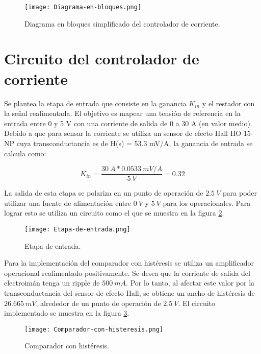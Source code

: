 \begin{figure}[H]
	\centering
	\texttt{[image: Diagrama-en-bloques.png]}
	\caption{Diagrama en bloques simplificado del controlador de corriente.}
	\label{fig:img_diag-en-bloques}
\end{figure}

\section{Circuito del controlador de corriente}

\noindent Se plantea la etapa de entrada que consiste en la ganancia $K_{in}$ y el restador con la señal realimentada. El objetivo es mapear una tensión de referencia en la entrada entre 0 y 5 V con una corriente de salida de 0 a 30 A (en valor medio).  Debido a que para sensar la corriente se utiliza un sensor de efecto Hall HO 15-NP cuya transconductancia es de H(s) = 53.3 mV/A, la ganancia de entrada se calcula como:

\begin{equation}
	K_{in}=\frac{30\:A*0.0533\:mV/A}{5\:V}=0.32 
\end{equation}


La salida de esta etapa se polariza en un punto de operación de $2.5\:V$ para poder utilizar una fuente de alimentación entre $0\:V$ y $5\:V$ para los operacionales. Para lograr esto se utiliza un circuito como el que se muestra en la figura \ref{fig:img_etapa-de-entrada}.


\begin{figure}[H]
	\centering
	\texttt{[image: Etapa-de-entrada.png]}
	\caption{Etapa de entrada.}
	\label{fig:img_etapa-de-entrada}
\end{figure}

Para la implementación del comparador con histéresis se utiliza un amplificador operacional realimentado positivamente. Se desea que la corriente de salida del electroimán tenga un ripple de $500\:mA$. Por lo tanto, al afectar este valor por la transconductancia del sensor de efecto Hall, se obtiene un ancho de histéresis de $26.665\:mV$, alrededor de un punto de operación de $2.5\:V$. El circuito implementado se muestra en la figura \ref{fig:img_comp-con-hist}.

\begin{figure}[H]
	\centering
	\texttt{[image: Comparador-con-histeresis.png]}
	\caption{Comparador con histéresis.}
	\label{fig:img_comp-con-hist}
\end{figure}


